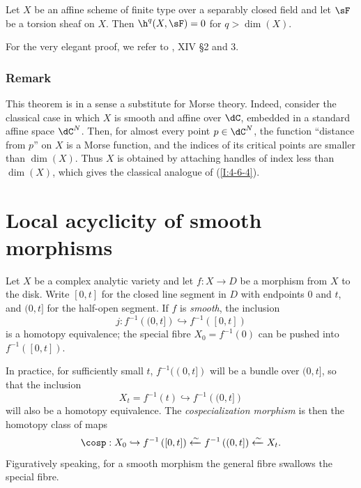 \documentclass[oneside]{book}
\begin{document}
\begin{theorem}\label{I:4-6-4}
Let $X$ be an affine scheme of finite type over a separably closed field
and let $\sF$ be a torsion sheaf on $X$. Then
$\h^q(X,\sF)=0$ for $q>\dim(X)$.
\end{theorem}

For the very elegant proof, we refer to \cite{sga4}, XIV \S 2 and 3.

\subsubsection{Remark}\label{I:4-6-5}

This theorem is in a sense a substitute for Morse theory. Indeed, consider
the classical case in which $X$ is smooth and affine over $\dC$, embedded
in a standard affine space $\dC^N$. Then, for almost every point
$p\in\dC^N$, the function “distance from $p$” on $X$ is a Morse
function, and the indices of its critical points are smaller than
$\dim(X)$. Thus $X$ is obtained by attaching handles of index less than
$\dim(X)$, which gives the classical analogue of (\ref{I:4-6-4}).

\section{Local acyclicity of smooth morphisms}\label{I:5}

Let $X$ be a complex analytic variety and let $f:X\to D$ be a morphism
from $X$ to the disk. Write $[0,t]$ for the closed line segment in $D$
with endpoints $0$ and $t$, and $(0,t]$ for the half-open segment. If
$f$ is \emph{smooth}, the inclusion
\[
  j : f^{-1}\left((0,t]\right) \hookrightarrow f^{-1}\left([0,t]\right)
\]
is a homotopy equivalence; the special fibre
$X_0=f^{-1}(0)$ can be pushed into $f^{-1}([0,t])$.

In practice, for sufficiently small $t$, $f^{-1}((0,t])$ will be a
bundle over $(0,t]$, so that the inclusion
\[
  X_t = f^{-1}(t) \hookrightarrow f^{-1}\left((0,t]\right)
\]
will also be a homotopy equivalence. The \emph{cospecialization morphism}
is then the homotopy class of maps
\[
  \cosp : X_0 \hookrightarrow f^{-1}\left([0,t]\right) \xleftarrow\sim f^{-1}\left((0,t]\right) \xleftarrow\sim X_t \text{.}
\]
Figuratively speaking,
for a smooth morphism the general fibre swallows the special fibre.
\end{document}
